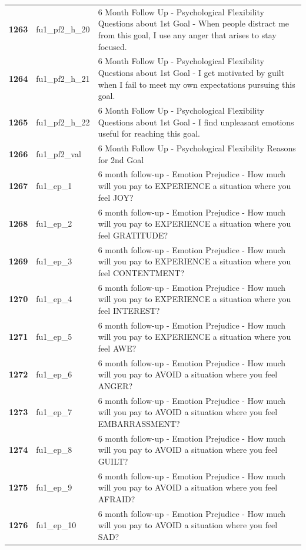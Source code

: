 \documentclass[
  letterpaper,
  DIV=11,
  numbers=noendperiod]{scrartcl}
\begin{document}
\begin{longtable}[t]{>{}cll}
\textbf{1263} & fu1\_pf2\_h\_20 & 6 Month Follow Up - Psychological Flexibility Questions about 1st Goal - When people distract me from this goal, I use any anger that arises to stay focused.\\
\textbf{1264} & fu1\_pf2\_h\_21 & 6 Month Follow Up - Psychological Flexibility Questions about 1st Goal - I get motivated by guilt when I fail to meet my own expectations pursuing this goal.\\
\textbf{1265} & fu1\_pf2\_h\_22 & 6 Month Follow Up - Psychological Flexibility Questions about 1st Goal - I find unpleasant emotions useful for reaching this goal.\\
\addlinespace
\textbf{1266} & fu1\_pf2\_val & 6 Month Follow Up - Psychological Flexibility Reasons for 2nd Goal\\
\textbf{1267} & fu1\_ep\_1 & 6 month follow-up - Emotion Prejudice - How much will you pay to EXPERIENCE a situation where you feel JOY?\\
\textbf{1268} & fu1\_ep\_2 & 6 month follow-up - Emotion Prejudice - How much will you pay to EXPERIENCE a situation where you feel GRATITUDE?\\
\textbf{1269} & fu1\_ep\_3 & 6 month follow-up - Emotion Prejudice - How much will you pay to EXPERIENCE a situation where you feel CONTENTMENT?\\
\textbf{1270} & fu1\_ep\_4 & 6 month follow-up - Emotion Prejudice - How much will you pay to EXPERIENCE a situation where you feel INTEREST?\\
\addlinespace
\textbf{1271} & fu1\_ep\_5 & 6 month follow-up - Emotion Prejudice - How much will you pay to EXPERIENCE a situation where you feel AWE?\\
\textbf{1272} & fu1\_ep\_6 & 6 month follow-up - Emotion Prejudice - How much will you pay to AVOID a situation where you feel ANGER?\\
\textbf{1273} & fu1\_ep\_7 & 6 month follow-up - Emotion Prejudice - How much will you pay to AVOID a situation where you feel EMBARRASSMENT?\\
\textbf{1274} & fu1\_ep\_8 & 6 month follow-up - Emotion Prejudice - How much will you pay to AVOID a situation where you feel GUILT?\\
\textbf{1275} & fu1\_ep\_9 & 6 month follow-up - Emotion Prejudice - How much will you pay to AVOID a situation where you feel AFRAID?\\
\addlinespace
\textbf{1276} & fu1\_ep\_10 & 6 month follow-up - Emotion Prejudice - How much will you pay to AVOID a situation where you feel SAD?\\

\end{longtable}
\end{document}
